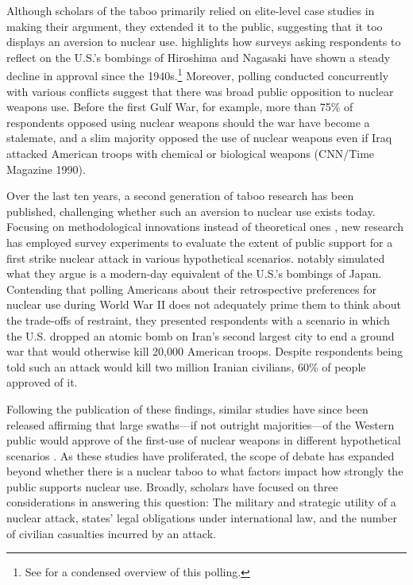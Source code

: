\documentclass[12pt]{article}
\begin{document}
Although scholars of the taboo primarily relied on elite-level case studies in making their argument, they extended it to the public, suggesting that it too displays an aversion to nuclear use. \citet{tannenwald_nuclear_2007}  highlights how surveys asking respondents to reflect on the U.S.'s bombings of Hiroshima and Nagasaki have shown a steady decline in approval since the 1940s.\footnote{See \citet{sagan_revisiting_2017} for a condensed overview of this polling.} Moreover, polling conducted concurrently with various conflicts suggest that there was broad public opposition to nuclear weapons use. Before the first Gulf War, for example, more than 75\% of respondents opposed using nuclear weapons should the war have become a stalemate, and a slim majority opposed the use of nuclear weapons even if Iraq attacked American troops with chemical or biological weapons (CNN/Time Magazine 1990).

Over the last ten years, a second generation of taboo research has been published, challenging whether such an aversion to nuclear use exists today. Focusing on methodological innovations instead of theoretical ones \citep{smetana_forum_2021}, new research has employed survey experiments to evaluate the extent of public support for a first strike nuclear attack in various hypothetical scenarios. \citet{sagan_revisiting_2017} notably simulated what they argue is a modern-day equivalent of the U.S.'s bombings of Japan. Contending that polling Americans about their retrospective preferences for nuclear use during World War II does not adequately prime them to think about the trade-offs of restraint, they presented respondents with a scenario in which the U.S. dropped an atomic bomb on Iran's second largest city to end a ground war that would otherwise kill 20,000 American troops. Despite respondents being told such an attack would kill two million Iranian civilians, 60\% of people approved of it.

Following the publication of these findings, similar studies have since been released affirming that large swaths—if not outright majorities—of the Western public would approve of the first-use of nuclear weapons in different hypothetical scenarios \citep{aronow_note_2019,haworth_what_2019, dill_kettles_2022,schwartz_when_2024}. As these studies have proliferated, the scope of debate has expanded beyond whether there is a nuclear taboo to what factors impact how strongly the public supports nuclear use. Broadly, scholars have focused on three considerations in answering this question: The military and strategic utility of a nuclear attack, states' legal obligations under international law, and the number of civilian casualties incurred by an attack.
\end{document}
